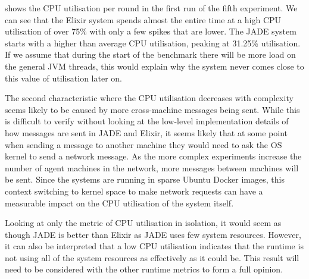  shows the CPU utilisation per round in the first run of the fifth experiment.
We can see that the Elixir system spends almost the entire time at a high CPU utilisation of over 75\% with only a few spikes that are lower.
The JADE system starts with a higher than average CPU utilisation, peaking at 31.25\% utilisation.
If we assume that during the start of the benchmark there will be more load on the general JVM threads, this would explain why the system never comes close to this value of utilisation later on.

The second characteristic where the CPU utilisation decreases with complexity seems likely to be caused by more cross-machine messages being sent.
While this is difficult to verify without looking at the low-level implementation details of how messages are sent in JADE and Elixir, it seems likely that at some point when sending a message to another machine they would need to ask the OS kernel to send a network message.
As the more complex experiments increase the number of agent machines in the network, more messages between machines will be sent.
Since the systems are running in sparse Ubuntu Docker images, this context switching to kernel space to make network requests can have a measurable impact on the CPU utilisation of the system itself.

Looking at only the metric of CPU utilisation in isolation, it would seem as though JADE is better than Elixir as JADE uses few system resources.
However, it can also be interpreted that a low CPU utilisation indicates that the runtime is not using all of the system resources as effectively as it could be.
This result will need to be considered with the other runtime metrics to form a full opinion.
